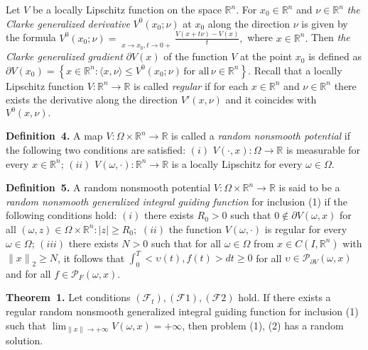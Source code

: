 Let $V$ be a locally Lipschitz function on the space $\mathbb{R}^{n}.$ For $x_{0} \in \mathbb{R}^{n}$ and $\nu \in \mathbb{R}^{n}$ {\it the Clarke generalized derivative} $V^{0}(x_{0} ;\nu )$ at $x_{0} $ along the direction $\nu $ is given by the formula
$
V^{0}(x_{0} ;\nu ) = \mathop{\overline {\lim}}\limits_{{x \to x_{0},}{t \to 0+}}\frac{{V(x + t\nu ) - V(x)}}{{t}},
$
where $x \in \mathbb{R}^{n}.$ Then {\it the Clarke genera\-li\-zed gradient} $\partial V(x)$ of the function $V$ at the point $x_{0}$ is defined as
$
\partial V(x_{0} ) = \left\{ {x \in \mathbb{R}^{n}: \langle {x,\nu } \rangle \le V^{0}(x_{0} ;\nu )\,\mbox{for all}\,\nu \in \mathbb{R}^{n}} \right\}.
$
Recall that a locally Lipschitz function $V:\mathbb{R}^n\to \mathbb{R}$ is called {\it regular} if for each $x\in \mathbb{R}^{n}$ and $\nu \in \mathbb{R}^{n}$ there exists the derivative along the direction  $V'(x,\nu)$ and it coincides with $V^0(x,\nu).$

\textbf{Definition~4.}
A map $V\colon\Omega\times\mathbb{R}^{n}\to\mathbb{R}$ is called a {\it random nonsmooth potential} if the following two conditions are satisfied:
$(i)$ $V(\cdot,x)\colon\Omega\to\mathbb{R}$ is measurable for every $x\in\mathbb{R}^{n}$; \linebreak
$(ii)$ $V(\omega,\cdot)\colon\mathbb{R}^{n}\to\mathbb{R}$ is a locally Lipschitz for every $\omega\in\Omega$.

\textbf{Definition~5.}
            A random nonsmooth potential $V\colon\Omega\times\mathbb{R}^{n}\to\mathbb{R}$ is said to be a {\it random nonsmooth generalized integral guiding function} for inclusion (1) if the following conditions hold:
            $(i)$ there exists $R_0>0$ such that
$
	0\notin\partial V(\omega,x)
$
for all $(\omega,z)\in\Omega\times\mathbb{R}^{n}\colon |z|\geq R_0;$
						$(ii)$ the function $V(\omega,\cdot)$ is regular for every $\omega\in\Omega$;
$(iii)$ there exists $N>0$ such that for all $\omega\in\Omega$ from $x\in C(I,\mathbb{R}^{n})$ with
						${\|x\|}_{2}\geq N$,  it follows that
            $
                \int_{0}^{T} \bigl<\upsilon(t),f(t)\bigr> dt \geq 0
            $
            for all $\upsilon\in\mathcal{P}_{\partial V}(\omega,x)$ and for all
						$f\in \mathcal{P}_{F}(\omega,x)$.
						
\textbf{Theorem~1.}
                Let conditions $(\mathcal{F}_t), (\mathcal{F}1), (\mathcal{F}2)$ hold. If there exists a regular random nonsmooth generalized integral guiding function for inclusion
                (1) such that $\lim_{\|x\|\to +\infty} V(\omega,x) = +\infty$, then problem (1), (2) has a random solution.

